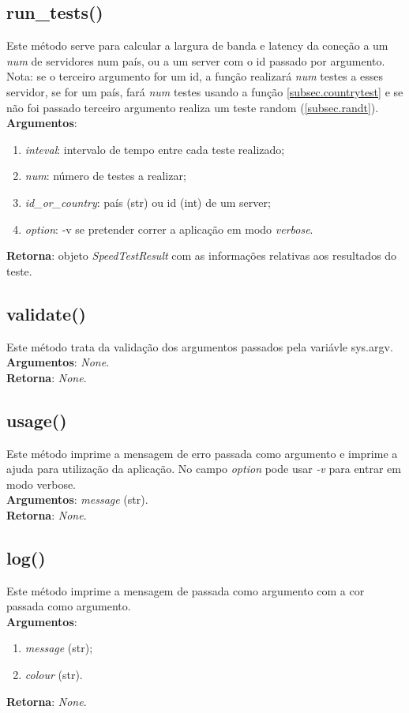 \documentclass{report}
\begin{document}
\subsection{run\_tests()}
\label{subsec.runt}
Este método serve para calcular a largura de banda e latency da coneção a um \textit{num} de servidores num país, ou a um server com o id passado por argumento.\\
Nota: se o terceiro argumento for um id, a função realizará \textit{num} testes a esses servidor, se for um país, fará \textit{num} testes usando a função \autoref{subsec.countrytest} e se não foi passado terceiro argumento realiza um teste random (\autoref{subsec.randt}).\\
\textbf{Argumentos}: 
\begin{enumerate}
\item \textit{inteval}: intervalo de tempo entre cada teste realizado;
\item \textit{num}: número de testes a realizar;
\item \textit{id\_or\_country}: país (str) ou id (int) de um server;
\item \textit{option}: -v se pretender correr a aplicação em modo \textit{verbose}.
\end{enumerate}
\textbf{Retorna}: objeto \textit{SpeedTestResult} com as informações relativas aos resultados do teste.

\subsection{validate()}
\label{subsec.validate}
Este método trata da validação dos argumentos passados pela variávle sys.argv.\\ 
\textbf{Argumentos}: \textit{None}.\\
\textbf{Retorna}: \textit{None}.

\subsection{usage()}
\label{subsec.usage}
Este método imprime a mensagem de erro passada como argumento e imprime a ajuda para utilização da aplicação. No campo \textit{option} pode usar \textit{-v} para entrar em modo verbose.\\ 
\textbf{Argumentos}: \textit{message} (str).\\
\textbf{Retorna}: \textit{None}.

\subsection{log()}
\label{subsec:log}
Este método imprime a mensagem de passada como argumento com a cor passada como argumento.\\ 
\textbf{Argumentos}: 
\begin{enumerate}
\item \textit{message} (str);
\item \textit{colour} (str).
\end{enumerate}
\textbf{Retorna}: \textit{None}.
\end{document}
